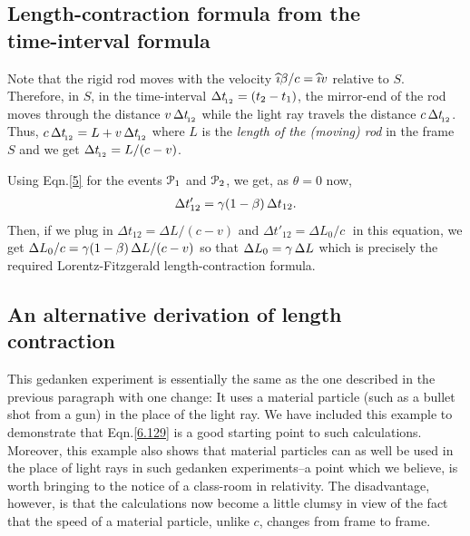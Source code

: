 \subsection{Length-contraction formula
from the\\ time-interval formula} 

Note that the rigid rod moves with the velocity 
${\widehat{\imath}}{\beta}/c 
={\widehat{\imath}} v $ relative to $S$. Therefore, in $S$, in the 
time-interval $\Delta t_{_{\hspace*{-1.5pt}{12}}} =(t_2-t_1)$, the 
mirror-end 
of the rod moves through the distance $v\, \Delta 
t_{_{\hspace*{-1.5pt}{12}}}$ while the light ray travels the distance $ 
c\, 
\Delta t_{_{\hspace*{-1.5pt}{12}}}$. Thus, $ c\, \Delta t_{_{\hspace*{-1.5pt}{12}}} 
=L+v\,\Delta t_{_{\hspace*{-1.5pt}{12}}}$ where $L$ is the 
\textsl{length of 
the (moving) rod} in the frame  $S$ and we get $\Delta 
t_{_{\hspace*{-1.5pt}{12}}}=L/(c-v)$.

Using Eqn.\eqref{5} for the events $\EuScript{P}_1$ 
and 
$\EuScript{P}_2$, we get, as $\theta=0$ now, 
\begin{align}\label{12} \Delta t'_{12} = {\gamma}(1 
-{\beta})\, 
\Delta t_{12}. \end{align} Then, if we plug in  
$\Delta 
t_{12} = \Delta L / (c - v) $ and $ \Delta t'_{1 2} = 
\Delta 
L_0 / c \;$ in this equation, we get $ \Delta L_0 / c 
= 
{\gamma} 
(1 - {\beta})\, \Delta L / (c - v)$ so that $\Delta L_0 = 
{\gamma}\, \Delta L$ which is precisely the required 
Lorentz-Fitzgerald length-contraction formula.

\subsection{An alternative derivation of 
length\\ contraction}
This gedanken experiment is essentially the same as the 
one 
described in the previous paragraph with one change: It 
uses 
a material particle (such as a bullet shot from a gun) 
in 
the place of the light ray. We have included this 
example to 
demonstrate that Eqn.\eqref{6.129} is a good starting 
point 
to such calculations. Moreover, this example also shows 
that 
material particles can as well be used in the place of 
light 
rays in such gedanken experiments--a point which we 
believe, 
is worth bringing to the notice of a class-room in 
relativity. The {disadvantage}, however, is that the 
calculations now become a little clumsy in view of the 
fact 
that the speed of a material particle, unlike $ c $, 
changes 
from frame to frame.

